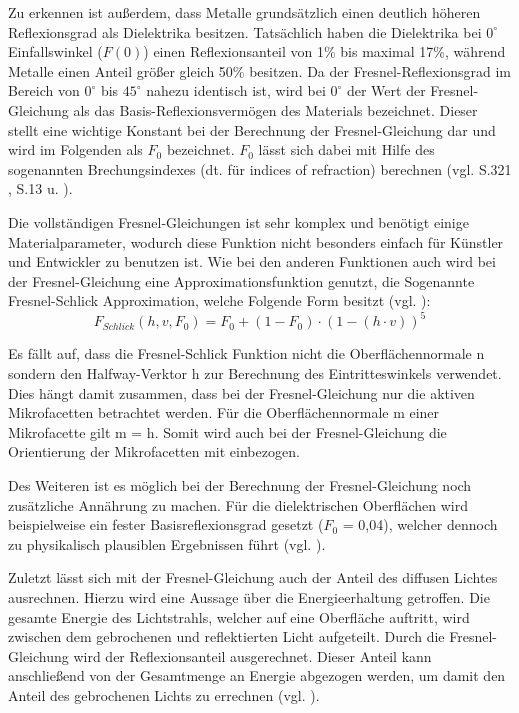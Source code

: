 \documentclass[
  11pt,
  a4paper,
  oneside
  ]{article}
\begin{document}
Zu erkennen ist außerdem, dass Metalle grundsätzlich einen deutlich höheren Reflexionsgrad als Dielektrika besitzen. Tatsächlich haben die Dielektrika bei $0^\circ$ Einfallswinkel ($F(0)$) einen Reflexionsanteil von 1\% bis maximal 17\%, während Metalle einen Anteil größer gleich 50\% besitzen. Da der Fresnel-Reflexionsgrad im Bereich von $0^\circ$ bis $45^\circ$ nahezu identisch ist, wird bei $0^\circ$ der Wert der Fresnel-Gleichung als das Basis-Reflexionsvermögen des Materials bezeichnet. Dieser stellt eine wichtige Konstant bei der Berechnung der Fresnel-Gleichung dar und wird im Folgenden als $F_{0}$ bezeichnet. $F_{0}$ lässt sich dabei mit Hilfe des sogenannten Brechungsindexes (dt. für indices of refraction) berechnen 
(vgl. S.321 \cite{realTimeRendering4th}, S.13 \cite{rtrPaper} u. \cite{learnOpenGL}).

Die vollständigen Fresnel-Gleichungen ist sehr komplex und benötigt einige Materialparameter, wodurch diese Funktion nicht besonders einfach für Künstler und Entwickler zu benutzen ist. Wie bei den anderen Funktionen auch wird bei der Fresnel-Gleichung eine Approximationsfunktion genutzt, die Sogenannte Fresnel-Schlick Approximation, welche Folgende Form besitzt (vgl. \cite{learnOpenGL}): 
\begin{equation}
  F_{Schlick}\left( h,v,F_{0}\right) =F_{0}+\left( 1-F_{0}\right) \cdot \left( 1-\left( h\cdot v\right) \right) ^{5}
\end{equation}

Es fällt auf, dass die Fresnel-Schlick Funktion nicht die Oberflächennormale n sondern den Halfway-Verktor h zur Berechnung des Eintritteswinkels verwendet. Dies hängt damit zusammen, dass bei der Fresnel-Gleichung nur die aktiven Mikrofacetten betrachtet werden. Für die Oberflächennormale m einer Mikrofacette gilt m = h. Somit wird auch bei der Fresnel-Gleichung die Orientierung der Mikrofacetten mit einbezogen. 

Des Weiteren ist es möglich bei der Berechnung der Fresnel-Gleichung noch zusätz\-liche Annährung zu machen. Für die dielektrischen Oberflächen wird beispielweise ein fester Basisreflexionsgrad gesetzt ($F_{0}$ = 0,04), welcher dennoch zu physikalisch plausiblen Ergebnissen führt (vgl. \cite{learnOpenGL}).

Zuletzt lässt sich mit der Fresnel-Gleichung auch der Anteil des diffusen Lichtes ausrechnen. Hierzu wird eine Aussage über die Energieerhaltung getroffen. Die gesamte Energie des Lichtstrahls, welcher auf eine Oberfläche auftritt, wird zwischen dem gebrochenen und reflektierten Licht aufgeteilt. Durch die Fresnel-Gleichung wird der Reflexionsanteil ausgerechnet. Dieser Anteil kann anschließend von der Gesamtmenge an Energie abgezogen werden, um damit den Anteil des gebrochenen Lichts zu errechnen (vgl. \cite{learnOpenGL}).
\end{document}
